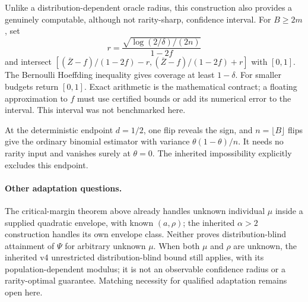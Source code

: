 Unlike a distribution-dependent oracle radius, this construction also provides
a genuinely computable, although not rarity-sharp, confidence interval.
For $B\ge2m$, set
\[r=\frac{\sqrt{\log(2/\delta)/(2n)}}{1-2f}\]
and intersect
$[(\overline Z-f)/(1-2f)-r,(\overline Z-f)/(1-2f)+r]$ with $[0,1]$.
The Bernoulli Hoeffding inequality gives coverage at least $1-\delta$.
For smaller budgets return $[0,1]$. Exact arithmetic is the mathematical
contract; a floating approximation to $f$ must use certified bounds or add its
numerical error to the interval. This interval was not benchmarked here.

At the deterministic endpoint $d=1/2$, one flip reveals the sign, and
$n=\lfloor B\rfloor$ flips give the ordinary binomial estimator with variance
$\theta(1-\theta)/n$. It needs no rarity input and vanishes surely at
$\theta=0$. The inherited impossibility explicitly excludes this endpoint.

\paragraph{Other adaptation questions.}
The critical-margin theorem above already handles unknown individual $\mu$
inside a supplied quadratic envelope, with known $(a,\rho)$; the inherited
$\alpha>2$ construction handles its own envelope class. Neither proves
distribution-blind attainment of $\Psi$ for arbitrary unknown $\mu$.
When both $\mu$ and $\rho$ are unknown, the inherited v4 unrestricted
distribution-blind bound still applies, with its population-dependent modulus;
it is not an observable confidence radius or a rarity-optimal guarantee.
Matching necessity for qualified adaptation remains open here.

